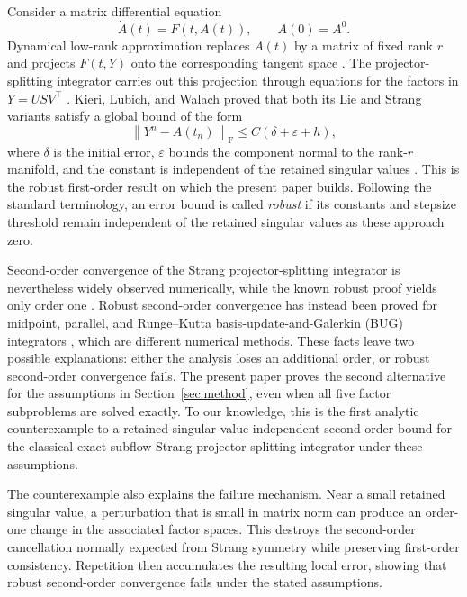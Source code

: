 \documentclass[]{article}
\numberwithin{equation}{section}
\theoremstyle{plain}
\theoremstyle{remark}
\newcommand{\F}{\mathrm F}
\newcommand{\norm}[1]{\left\lVert #1\right\rVert}
\newcommand{\eps}{\varepsilon}
\begin{document}
Consider a matrix differential equation
\begin{equation}\label{eq:ode-intro}
 \dot A(t)=F(t,A(t)),\qquad A(0)=A^0.
\end{equation}
Dynamical low-rank approximation replaces $A(t)$ by a matrix of fixed
rank $r$ and projects $F(t,Y)$ onto the corresponding tangent
space \cite{KochLubich2007}.  The projector-splitting integrator carries
out this projection through equations for the factors in
$Y=USV^\top$ \cite{LubichOseledets2014}.  Kieri, Lubich, and Walach
proved that both its Lie and Strang variants satisfy a global bound of the
form
\[
 \norm{Y^n-A(t_n)}_{\F}\le C(\delta+\eps+h),
\]
where $\delta$ is the initial error, $\eps$ bounds the component normal
to the rank-$r$ manifold, and the constant is independent of the
retained singular values
\cite{KieriLubichWalach2016}.  This is the robust first-order result on
which the present paper builds.
Following the standard terminology, an error bound is called
\emph{robust} if its constants and stepsize threshold remain independent
of the retained singular values as these approach zero.

Second-order convergence of the Strang projector-splitting integrator
is nevertheless widely observed numerically, while the known robust
proof yields only order one
\cite{CerutiEinkemmerKuschLubich2024}.  Robust second-order convergence
has instead been proved for midpoint, parallel, and Runge--Kutta
basis-update-and-Galerkin (BUG) integrators
\cite{CerutiEinkemmerKuschLubich2024,Kusch2025,NobileRiffaud2026},
which are different numerical methods.  These facts leave two possible explanations:
either the analysis loses an additional order, or robust second-order
convergence fails.  The present paper proves the
second alternative for the assumptions in Section~\ref{sec:method},
even when all five factor subproblems are solved exactly.  To our
knowledge, this is the first analytic counterexample to a
retained-singular-value-independent second-order bound for the classical
exact-subflow Strang projector-splitting integrator under these
assumptions.

The counterexample also explains the failure mechanism.  Near a small
retained singular value, a perturbation that is small in matrix norm can
produce an order-one change in the associated factor spaces.  This
destroys the second-order cancellation normally expected from Strang
symmetry while preserving first-order consistency.  Repetition then
accumulates the resulting local error, showing that robust second-order
convergence fails under the stated assumptions.
\end{document}
